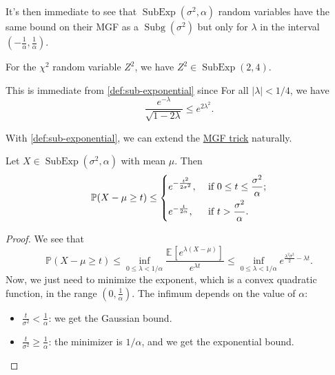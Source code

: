 It's then immediate to see that \(\mathop{\mathrm{SubExp}}(\sigma^2,\alpha)\) random variables have the same bound on their MGF as a \(\mathop{\mathrm{Subg}}(\sigma^2)\) but only for \(\lambda\) in the interval \((-\frac{1}{\alpha},\frac{1}{\alpha})\).

\begin{eg}
	For the \(\chi ^2\) random variable \(Z^2\), we have \(Z^2 \in \mathop{\mathrm{SubExp}}(2, 4) \).
\end{eg}
\begin{explanation}
	This is immediate from \autoref{def:sub-exponential} since For all \(\vert \lambda \vert < 1 / 4\), we have
	\[
		\frac{e^{-\lambda }}{\sqrt{1 - 2 \lambda } } \leq e^{2 \lambda ^{2} }.
	\]
\end{explanation}

With \autoref{def:sub-exponential}, we can extend the \hyperref[lma:MGF-trick]{MGF trick} naturally.

\begin{lemma}\label{lma:MGF-trick-SubExp}
	Let \(X \in \mathop{\mathrm{SubExp}}(\sigma ^{2} , \alpha ) \) with mean \(\mu \). Then
	\[
		\mathbb{P} (X - \mu \geq t) \leq
		\begin{dcases}
			e^{- \frac{t^2}{2 \sigma ^{2} }}, & \text{ if } 0 \leq t \leq \frac{\sigma ^{2}}{\alpha } ; \\
			e^{- \frac{t}{2\alpha }},         & \text{ if } t > \frac{\sigma ^{2} }{\alpha }.
		\end{dcases}
	\]
\end{lemma}
\begin{proof}
	We see that
	\[
		\mathbb{P} (X- \mu \geq t)
		\leq \inf _{0 \leq \lambda < 1 / \alpha } \frac{\mathbb{E}_{}\left[e^{\lambda (X - \mu )} \right] }{e^{\lambda t}}
		\leq \inf _{0 \leq \lambda < 1 / \alpha } e^{\frac{\lambda ^{2} \sigma ^{2} }{2} - \lambda t}.
	\]
	Now, we just need to minimize the exponent, which is a convex quadratic function, in the range \((0,\frac{1}{\alpha})\). The infimum depends on the value of \(\alpha\):
	\begin{itemize}
		\item \(\frac{t}{\sigma ^{2} } < \frac{1}{\alpha }\): we get the Gaussian bound.
		\item \(\frac{t}{\sigma ^{2} } \geq \frac{1}{\alpha }\): the minimizer is \(1 / \alpha \), and we get the exponential bound.
	\end{itemize}
\end{proof}

